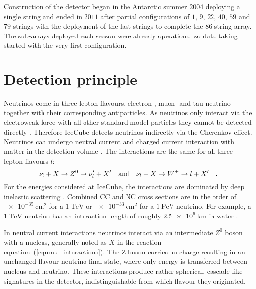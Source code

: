 Construction of the detector began in the Antarctic summer $\num{2004}$ deploying a single string and ended in $\num{2011}$ after partial configurations of $\num{1}$, $\num{9}$, $\num{22}$, $\num{40}$, $\num{59}$ and $\num{79}$ strings with the deployment of the last strings to complete the $\num{86}$ string array.
The sub-arrays deployed each season were already operational so data taking started with the very first configuration\cite{Aartsen:2016nxy}.

\section{Detection principle}
Neutrinos come in three lepton flavours, electron-, muon- and tau-neutrino together with their corresponding antiparticles.
As neutrinos only interact via the electroweak force with all other standard model particles they cannot be detected directly \cite{Patrignani:2016xqp}.
Therefore IceCube detects neutrinos indirectly via the Cherenkov effect.
Neutrinos can undergo neutral current and charged current interaction with matter in the detection volume \cite{Fisk:1982ccnc}.
The interactions are the same for all three lepton flavours $l$:
\begin{equation}
  \label{equ:nu_interactions}
  \nu_l + X \rightarrow Z^0 \rightarrow \nu'_l + X'
  \quad\text{and}\quad
  \nu_l + X \rightarrow W^{\pm} \rightarrow l + X'
  \quad\text{.}
\end{equation}
For the energies considered at IceCube, the interactions are dominated by deep inelastic scattering \cite{CooperSarkar:2011pa}.
Combined CC and NC cross sections are in the order of $\SI{e-35}{\cm\squared}$ for a $\SI{1}{\TeV}$ or $\SI{e-33}{\cm\squared}$ for a $\SI{1}{\peta\eV}$ neutrino.
For example, a $\SI{1}{\TeV}$ neutrino has an interaction length of roughly $\SI{2.5e6}{\km}$ in water \cite{Gandhi:1995tf}.

In neutral current interactions neutrinos interact via an intermediate $Z^0$ boson with a nucleus, generally noted as $X$ in the reaction equation~(\ref{equ:nu_interactions}).
The Z boson carries no charge resulting in an unchanged flavour neutrino final state, where only energy is transferred between nucleus and neutrino.
These interactions produce rather spherical, cascade-like signatures in the detector, indistinguishable from which flavour they originated.

